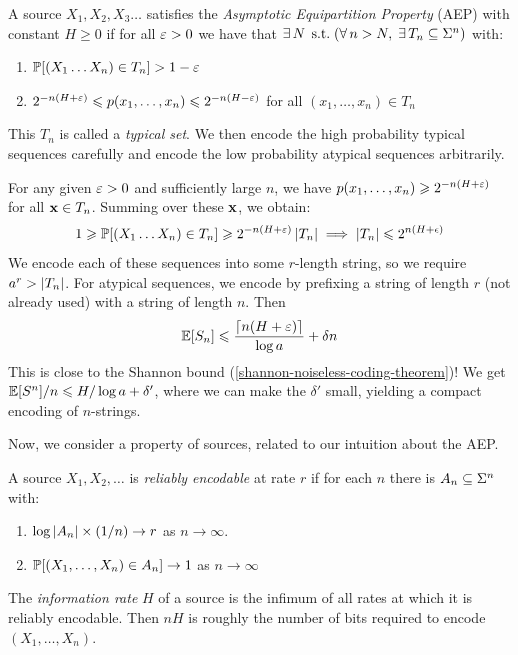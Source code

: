 \documentclass{article}
\begin{document}
\begin{definition}
	\label{asymptotic-equipartition-property}
    A source $X_1, X_2, X_3 \dots$ satisfies the
    \textit{Asymptotic Equipartition Property} (AEP)
    with constant $H \geq 0$
    if for all $\eps > 0$ we have that
    $\exists \, N \suchthat
    (\forall \, n > N, \; \exists \, T_n \subs \Sigma^n)$
    with:
    
	\begin{enumerate}
	    \item $\P[(X_1 \dots X_n) \in T_n] > 1-\eps$
	    \item $2^{-n(H+\eps)} \leq p(x_1, \dots , x_n) \leq 2^{-n(H-\eps)}$ for all $(x_1, \dots, x_n) \in T_n$
	\end{enumerate}
	
	This $T_n$ is called a \textit{typical set}.
	We then encode the high probability typical sequences carefully
	and encode the low probability atypical sequences arbitrarily.
\end{definition}

\begin{remark}
	For any given $\eps > 0$ and sufficiently large $n$,
	we have $p(x_1, \dots, x_n) \geq 2^{-n(H+\eps)}$
	for all $\x \in T_n$.
	Summing over these $\x$, we obtain:
	\[
	1 \geq \P[(X_1 \dots X_n) \in T_n] \geq
	2^{-n(H+\eps)} \abs{T_n}
	\implies
	\abs{T_n} \leq 2^{n(H+\epsilon)}
	\]
	We encode each of these sequences into some $r$-length string,
	so we require $a^r > \abs{T_n}$.
	For atypical sequences,
	we encode by prefixing a string of length $r$ (not already used)
	with a string of length $n$. Then
	\[
	\E[S_n] \leq \frac{\ceil{n(H+\eps)}}{\log a} + \delta n
	\]
	This is close to the Shannon bound (\ref{shannon-noiseless-coding-theorem})!
	We get $\E[S^n]/n \leq H/\log a + \delta'$,
	where we can make the $\delta'$ small,
	yielding a compact encoding of $n$-strings.
\end{remark}

Now, we consider a property of sources, related to our intuition about the AEP.

\begin{definition}
	\label{reliable-encodability-information-rate}
    A source $X_1, X_2, \dots$ is \textit{reliably encodable}
    at rate $r$ if for each $n$ there is $A_n \subs \Sigma^n$ with:
    
    \begin{enumerate}
    	\item $\log \abs{A_n} \times (1/n) \to r$ as $n \to \infty$.
    	\item $\P[(X_1, \dots, X_n) \in A_n] \to 1$ as $n \to \infty$
	\end{enumerate}
	
	The \textit{information rate} $H$ of a source
	is the infimum of all rates at which it is reliably encodable.
	Then $nH$ is roughly the number of bits required to encode $(X_1, \dots, X_n)$.
\end{definition}
\end{document}
